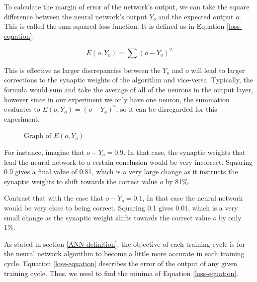 \documentclass[12pt]{article}
\begin{document}
To calculate the margin of error of the network's output, we can take the square difference between the neural network's output \(Y_o\) and the expected output \(o\). This is called the sum squared loss function. It is defined as in Equation \ref{loss-equation}.

\begin{equation} \label{loss-equation}
  E(o , Y_o) = \sum (o - Y_o)^2
\end{equation}

This is effective as larger discrepancies between the $Y_o$ and $o$ will lead to larger corrections to the synaptic weights of the algorithm and vice-versa. Typically, the formula would sum and take the average of all of the neurons in the output layer, however since in our experiment we only have one neuron, the summation evaluates to $E(o , Y_o) = (o - Y_o)^2$, so it can be disregarded for this experiment.

\begin{figure}[h]
  \centering
  \caption{Graph of $E(o, Y_o)$ \label{errorgraph}}
\end{figure}

For instance, imagine that $o - Y_o = 0.9$. In that case, the synaptic weights that lead the neural network to a certain conclusion would be very incorrect. Squaring 0.9 gives a final value of 0.81, which is a very large change as it instructs the synaptic weights to shift towards the correct value $o$ by 81\%.

Contrast that with the case that $o - Y_o = 0.1$, In that case the neural network would be very close to being correct. Squaring 0.1 gives 0.01, which is a very small change as the synaptic weight shifts towards the correct value $o$ by only 1\%.

As stated in section \ref{ANN-definition}, the objective of each training cycle is for the neural network algorithm to become a little more accurate in each training cycle. Equation \ref{loss-equation} describes the error of the output of any given training cycle. Thus, we need to find the minima of Equation \ref{loss-equation}.
\end{document}
